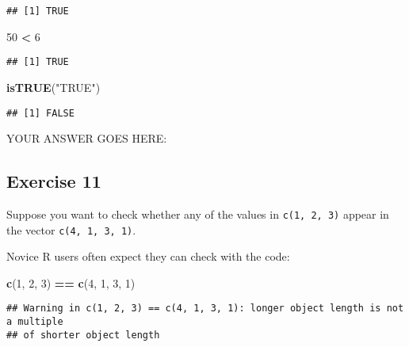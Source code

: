 \documentclass[
]{article}
\newenvironment{Shaded}{\begin{snugshade}}{\end{snugshade}}
\newcommand{\DecValTok}[1]{\textcolor[rgb]{0.00,0.00,0.81}{#1}}
\newcommand{\KeywordTok}[1]{\textcolor[rgb]{0.13,0.29,0.53}{\textbf{#1}}}
\newcommand{\NormalTok}[1]{#1}
\newcommand{\OperatorTok}[1]{\textcolor[rgb]{0.81,0.36,0.00}{\textbf{#1}}}
\newcommand{\StringTok}[1]{\textcolor[rgb]{0.31,0.60,0.02}{#1}}
\begin{document}
\begin{verbatim}
## [1] TRUE
\end{verbatim}

\begin{Shaded}
\begin{Highlighting}[]
\DecValTok{50} \OperatorTok{\textless{}}\StringTok{ \textquotesingle{}6\textquotesingle{}}
\end{Highlighting}
\end{Shaded}

\begin{verbatim}
## [1] TRUE
\end{verbatim}

\begin{Shaded}
\begin{Highlighting}[]
\KeywordTok{isTRUE}\NormalTok{(}\StringTok{"TRUE"}\NormalTok{)}
\end{Highlighting}
\end{Shaded}

\begin{verbatim}
## [1] FALSE
\end{verbatim}

YOUR ANSWER GOES HERE:

\hypertarget{exercise-11}{%
\subsection{Exercise 11}\label{exercise-11}}

Suppose you want to check whether any of the values in
\texttt{c(1,\ 2,\ 3)} appear in the vector \texttt{c(4,\ 1,\ 3,\ 1)}.

Novice R users often expect they can check with the code:

\begin{Shaded}
\begin{Highlighting}[]
\KeywordTok{c}\NormalTok{(}\DecValTok{1}\NormalTok{, }\DecValTok{2}\NormalTok{, }\DecValTok{3}\NormalTok{) }\OperatorTok{==}\StringTok{ }\KeywordTok{c}\NormalTok{(}\DecValTok{4}\NormalTok{, }\DecValTok{1}\NormalTok{, }\DecValTok{3}\NormalTok{, }\DecValTok{1}\NormalTok{)}
\end{Highlighting}
\end{Shaded}

\begin{verbatim}
## Warning in c(1, 2, 3) == c(4, 1, 3, 1): longer object length is not a multiple
## of shorter object length
\end{verbatim}
\end{document}
